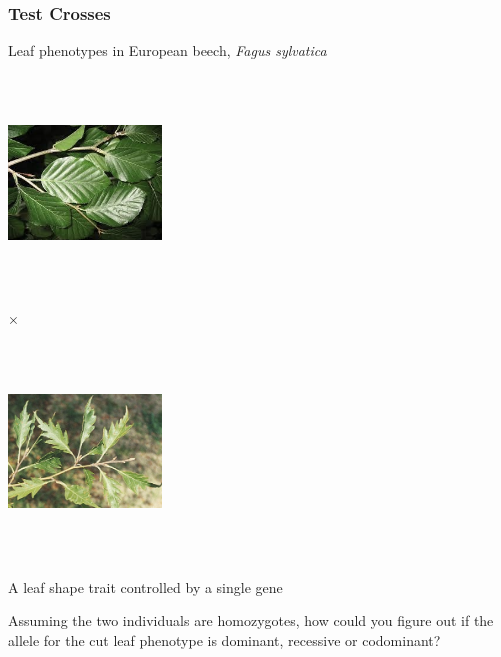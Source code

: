 \documentclass{beamer}
\begin{document}
\begin{frame}
	\frametitle{Test Crosses}
	Leaf phenotypes in European beech, \textit{Fagus sylvatica}
	\begin{center}
	\newcommand{\picA}{\includegraphics[keepaspectratio, height=2.25in,width=1.6in]{img/roundBeechLeaf}}
	\newcommand{\picB}{\includegraphics[keepaspectratio, height=2.25in,width=1.6in]{img/cutBeechLeaf}}
	\Huge
	\parbox{\widthof{\picA}}{\picA} $\times$ 
	\parbox{\widthof{\picB}}{\picB} 
\end{center}	
	\normalsize
	A leaf shape trait controlled by a single gene 
	\bigskip
	
	Assuming the two individuals are homozygotes, how could you figure out if the allele for the cut leaf phenotype is dominant, recessive or codominant?
	
\end{frame}





\end{document}
